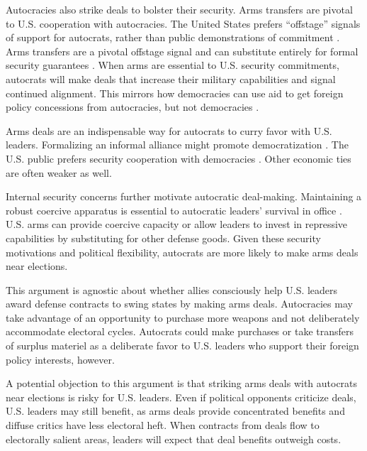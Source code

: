 \documentclass[12pt]{article}
\begin{document}
Autocracies also strike deals to bolster their security.
Arms transfers are pivotal to U.S. cooperation with autocracies.  
The United States prefers ``offstage'' signals of support for autocrats, rather than public demonstrations of commitment \citep{McManusYarhi-Milo2017}.
Arms transfers are a pivotal offstage signal and can substitute entirely for formal security guarantees \citep{Yarhi-Miloetal2016}. 
When arms are essential to U.S. security commitments, autocrats will make deals that increase their military capabilities and signal continued alignment.
This mirrors how democracies can use aid to get foreign policy concessions from autocracies, but not democracies \citep{BDMSmith2009}.


Arms deals are an indispensable way for autocrats to curry favor with U.S. leaders. 
Formalizing an informal alliance might promote democratization \citep{GiblerWolford2006}.
The U.S. public prefers security cooperation with democracies \citep{Alley2022}. 
Other economic ties are often weaker as well. 


Internal security concerns further motivate autocratic deal-making. 
Maintaining a robust coercive apparatus is essential to autocratic leaders' survival in office \citep{Boix2008}. 
U.S. arms can provide coercive capacity or allow leaders to invest in repressive capabilities by substituting for other defense goods. 
Given these security motivations and political flexibility, autocrats are more likely to make arms deals near elections.


This argument is agnostic about whether allies consciously help U.S. leaders award defense contracts to swing states by making arms deals.
Autocracies may take advantage of an opportunity to purchase more weapons and not deliberately accommodate electoral cycles. 
Autocrats could make purchases or take transfers of surplus materiel as a deliberate favor to U.S. leaders who support their foreign policy interests, however. 


A potential objection to this argument is that striking arms deals with autocrats near elections is risky for U.S. leaders. 
Even if political opponents criticize deals, U.S. leaders may still benefit, as arms deals provide concentrated benefits and diffuse critics have less electoral heft.
When contracts from deals flow to electorally salient areas, leaders will expect that deal benefits outweigh costs. 
\end{document}
